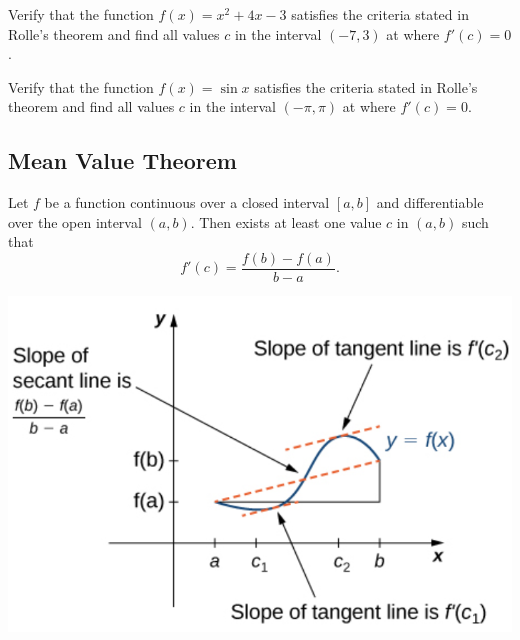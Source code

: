 \begin{example}

Verify that the function \(f(x)=x^2+4x-3\) satisfies the criteria stated
in Rolle's theorem and find all values \(c\) in the interval \((-7, 3)\)
at where \(f'(c)=0\).

\end{example}
\vspace*{6\baselineskip}

\begin{example}

Verify that the function \(f(x)=\sin x\) satisfies the criteria stated
in Rolle's theorem and find all values \(c\) in the interval
\((-\pi, \pi)\) at where \(f'(c)=0\).

\end{example}
\vspace*{6\baselineskip}

\hypertarget{mean-value-theorem-1}{%
\subsection{Mean Value Theorem}\label{mean-value-theorem-1}}

\begin{theorem}

Let \(f\) be a function continuous over a closed interval \([a,b]\) and
differentiable over the open interval \((a,b)\). Then exists at least
one value \(c\) in \((a,b)\) such that \[f'(c)=\frac{f(b)-f(a)}{b-a}.\]
\begin{fullwidth}
  \centering
  \includegraphics[scale=0.4]{img/image-20200323192552917.png}
\end{fullwidth}

\end{theorem}

